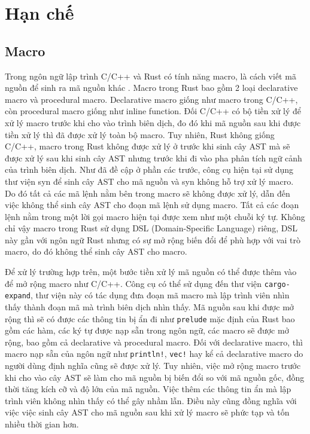 \section{Hạn chế}

\subsection{Macro}

Trong ngôn ngữ lập trình C/C++ và Rust có tính năng macro, là cách viết mã nguồn để sinh ra mã nguồn khác \cite{rustlangMacrosRust}.
Macro trong Rust bao gồm 2 loại declarative macro và procedural macro.
Declarative macro giống như macro trong C/C++, còn procedural macro giống như inline function.
Đối C/C++ có bộ tiền xử lý để xử lý macro trước khi cho vào trình biên dịch, đo đó khi mã nguồn sau khi được tiền xử lý thì đã được xử lý toàn bộ macro.
Tuy nhiên, Rust không giống C/C++, macro trong Rust không được xử lý ở trước khi sinh cây AST mà sẽ được xử lý sau khi sinh cây AST nhưng trước khi đi vào pha phân tích ngữ cảnh của trình biên dịch.
Như đã đề cập ở phần các trước, công cụ hiện tại sử dụng thư viện syn để sinh cây AST cho mã nguồn và syn không hỗ trợ xử lý macro.
Do đó tất cả các mã lệnh nằm bên trong macro sẽ không được xử lý, dẫn đến việc không thể sinh cây AST cho đoạn mã lệnh sử dụng macro.
Tất cả các đoạn lệnh nằm trong một lời gọi macro hiện tại được xem như một chuỗi ký tự.
Không chỉ vậy macro trong Rust sử dụng DSL (Domain-Specific Language) riêng, DSL này gần với ngôn ngữ Rust nhưng có sự mở rộng biến đổi để phù hợp với vai trò macro, do đó không thể sinh cây AST cho macro.

Để xử lý trường hợp trên, một bước tiền xử lý mã nguồn có thể được thêm vào để mở rộng macro như C/C++.
Công cụ có thể sử dụng đến thư viện \texttt{cargo-expand}, thư viện này có tác dụng đưa đoạn mã macro mà lập trình viên nhìn thấy thành đoạn mã mà trình biên dịch nhìn thấy.
Mã nguồn sau khi được mở rộng thì sẽ có được các thông tin bị ẩn đi như \texttt{prelude} mặc định của Rust bao gồm các hàm, các ký tự được nạp sẵn trong ngôn ngữ, các macro sẽ được mở rộng, bao gồm cả declarative và procedural macro.
Đối với declarative macro, thì macro nạp sẵn của ngôn ngữ như \texttt{println!}, \texttt{vec!} hay kể cả declarative macro do người dùng định nghĩa cũng sẽ được xử lý.
Tuy nhiên, việc mở rộng macro trước khi cho vào cây AST sẽ làm cho mã nguồn bị biến đổi so với mã nguồn gốc, đồng thời tăng kích cỡ và độ lớn của mã nguồn.
Việc thêm các thông tin ẩn mà lập trình viên không nhìn thấy có thể gây nhầm lẫn.
Điều này cũng đồng nghĩa với việc việc sinh cây AST cho mã nguồn sau khi xử lý macro sẽ phức tạp và tốn nhiều thời gian hơn.

